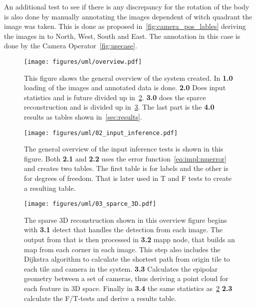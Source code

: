 An additional test to see if there is any discrepancy for the rotation of the body is also done by manually annotating the images dependent of witch quadrant
the image was taken.
This is done as proposed in~\ref{fig:camera_pos_lables} deriving the images in to North, West, South and East.
The annotation in this case is done by the Camera Operator~\ref{fig:usecase}.





\begin{figure}
\begin{center}
    \texttt{[image: figures/uml/overview.pdf]}
\end{center}
\caption{This figure shows the general overview of the system created. In \textbf{1.0} loading of the images and annotated data is done.
    \textbf{2.0} Does input statistics and is future divided up in~\ref{fig:method:inference}. \textbf{3.0} does the sparce reconstruction and is divided up in~\ref{fig:method:sparce3d}.
The last part is the \textbf{4.0} results as tables shown in~\ref{sec:results}.}\label{fig:method:overview}
\end{figure}

\begin{figure}
\begin{center}
    \texttt{[image: figures/uml/02\_input\_inference.pdf]}
\end{center}
\caption{The general overview of the input inference tests is shown in this figure.
    Both \textbf{2.1} and \textbf{2.2} uses the error function~\ref{eq:impl:muerror} and creates two tables. The first table is for labels and the other is for degrees of freedom. That is later used in T and F tests to create a resulting table.
}
\label{fig:method:inference}
\end{figure}


\begin{figure}
    \begin{center}
        \texttt{[image: figures/uml/03\_sparce\_3D.pdf]}
    \end{center}
    \caption{The sparse 3D reconstruction shown in this overview figure begins with \textbf{3.1} detect that handles the \aruco{ } detection from each image.
        The output from that is then processed in \textbf{3.2} mapp node, that builds an map from each corner in each image. This step also includes the Dijkstra algorithm to calculate the shortest path from \aruco{ } origin tile to each tile and camera in the system.
        \textbf{3.3} Calculates the epipolar geometry between a set of cameras, thus deriving a point cloud for each feature in 3D space.
        Finally in \textbf{3.4} the same statistics as~\ref{fig:method:inference} \textbf{2.3} calculate the F/T-tests and derive a results table.
    }\label{fig:method:sparce3d}
\end{figure}






